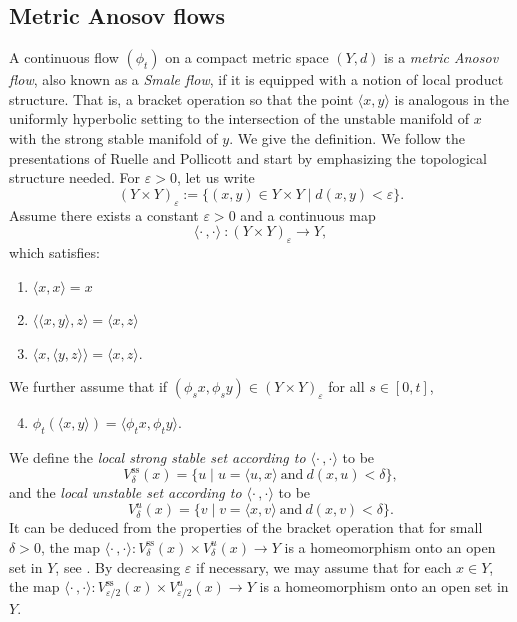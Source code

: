 \documentclass[JEP,XML,SOM,Unicode,NoFloatCountersInSection]{cedram}
\let\epsilon\varepsilon
\let\sep\mid
\newcommand{\lrangle}{\langle\cdot\,,\cdot\rangle}
\newenvironment{enumeratea}
{\bgroup\def\theenumi{\alph{enumi}}\begin{enumerate}}
{\end{enumerate}\egroup}
\newcommand{\sts}{\mathrm{ss}}
\theoremstyle{definition}
\numberwithin{equation}{section}
\begin{document}
\subsection{Metric Anosov flows}\label{sec:smale}
A continuous flow $(\phi_t)$ on a compact metric space $(Y, d)$ is a \emph{metric Anosov flow}, also known as a \emph{Smale flow}, if it is equipped with a notion of local product structure. That is, a bracket operation so that the point $\langle x,y\rangle $ is analogous in the uniformly hyperbolic setting to the intersection of the unstable manifold of $x$ with the strong stable manifold of $y$. We give the definition. We follow the presentations of Ruelle and Pollicott and start by emphasizing the topological structure needed. For $\epsilon>0$, let us write
\[ (Y \times Y)_\epsilon := \{(x,y) \in Y \times Y \sep d(x,y) < \epsilon\}. \]
Assume there exists a constant $\epsilon>0$ and a continuous map
\[ \lrangle ~: (Y \times Y)_\epsilon \to Y, \]
which satisfies:
\begin{enumeratea}
\item\label{enum:a} $\langle x,x\rangle =x$
\item\label{enum:b} $\langle \langle x,y\rangle,z\rangle =\langle x, z\rangle $
\item\label{enum:c} $\langle x, \langle y,z\rangle \rangle =\langle x, z\rangle $.
\end{enumeratea}
\noindent
We further assume that if $(\phi_sx,\phi_sy) \in (Y\times Y)_\epsilon$ for all $s\in[0,t]$,
\begin{enumeratea}\setcounter{enumi}{3}
\item\label{enum:d}$\phi_t(\langle x,y \rangle)= \langle \phi_tx, \phi_ty \rangle$.
\end{enumeratea}
\noindent
We define the \emph{local strong stable set according to $\lrangle $} to be
\[ V^{\sts}_\delta (x) = \{ u \sep u = \langle u,x\rangle \mathrm{ ~and~ } d(x, u)< \delta \}, \]
and the \emph{local unstable set according to $\lrangle $} to be
\[ V^{u}_\delta (x) = \{ v \sep v = \langle x,v\rangle \mathrm{ ~and~ } d(x, v)< \delta \}. \]
It can be deduced from the properties of the bracket operation that for small $\delta>0$, the map $\lrangle : V^{\sts}_{\delta} (x) \times V^{u}_{\delta} (x) \to Y$ is a homeomorphism onto an open set in $Y$, see \cite[\S7.1]{Ruelle}.
By decreasing $\epsilon$ if necessary, we may assume that for each $x \in Y$, the map $\lrangle : V^{\sts}_{\epsilon/2} (x) \times V^{u}_{\epsilon/2} (x) \to Y$ is a homeomorphism onto an open set in $Y$.
\end{document}
